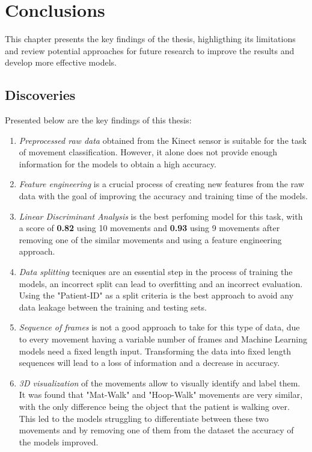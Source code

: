 %
%
%
\chapter{Conclusions}

    This chapter presents the key findings of the thesis, highligthing its limitations and review potential approaches for future research to improve the results and develop more effective models.

    \section{Discoveries}

        Presented below are the key findings of this thesis: 
        \begin{enumerate}
            \item \textit{Preprocessed raw data} obtained from the Kinect sensor is suitable for the task of movement classification. However, it alone does not provide enough information for the models to obtain a high accuracy.
            \item \textit{Feature engineering} is a crucial process of creating new features from the raw data with the goal of improving the accuracy and training time of the models.
            \item \textit{Linear Discriminant Analysis} is the best perfoming model for this task, with a score of \textbf{0.82} using 10 movements and \textbf{0.93} using 9 movements after removing one of the similar movements and using a feature engineering approach.
            \item \textit{Data splitting} tecniques are an essential step in the process of training the models, an incorrect split can lead to overfitting and an incorrect evaluation. Using the "Patient-ID" as a split criteria is the best approach to avoid any data leakage between the training and testing sets.
            \item \textit{Sequence of frames} is not a good approach to take for this type of data, due to every movement having a variable number of frames and Machine Learning models need a fixed length input. Transforming the data into fixed length sequences will lead to a loss of information and a decrease in accuracy.
            \item \textit{3D visualization} of the movements allow to visually identify and label them. It was found that "Mat-Walk" and "Hoop-Walk" movements are very similar, with the only difference being the object that the patient is walking over. This led to the models struggling to differentiate between these two movements and by removing one of them from the dataset the accuracy of the models improved.
        \end{enumerate}
    

